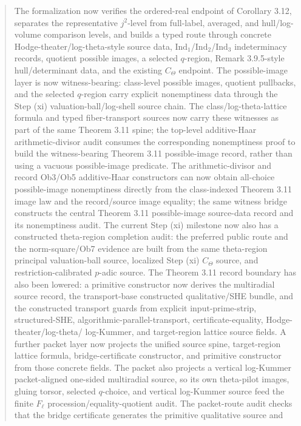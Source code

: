 \documentclass[11pt]{article}
\newcommand{\CTheta}{C_\Theta}
\newcommand{\IndOne}{\ensuremath{\mathrm{Ind}_1}}
\newcommand{\IndTwo}{\ensuremath{\mathrm{Ind}_2}}
\newcommand{\IndThree}{\ensuremath{\mathrm{Ind}_3}}
\theoremstyle{plain}
\theoremstyle{definition}
\theoremstyle{remark}
\begin{document}
\begin{abstract}
The formalization now verifies the ordered-real endpoint of Corollary 3.12,
separates the representative \(j^2\)-level from full-label, averaged, and
hull/log-volume comparison levels, and builds a typed route through
concrete Hodge-theater/log-theta-style source data, \IndOne/\IndTwo/\IndThree
indeterminacy records, quotient possible images, a selected \(q\)-region,
Remark 3.9.5-style hull/determinant data, and the existing \(\CTheta\)
endpoint.  The possible-image layer is now witness-bearing: class-level
possible images, quotient pullbacks, and the selected \(q\)-region carry
explicit nonemptiness data through the Step (xi) valuation-ball/log-shell
source chain.  The class/log-theta-lattice formula and typed fiber-transport
sources now carry these witnesses as part of the same Theorem 3.11 spine; the
top-level additive-Haar arithmetic-divisor audit consumes the corresponding
nonemptiness proof to build the witness-bearing Theorem 3.11 possible-image
record, rather than using a vacuous possible-image predicate.  The
arithmetic-divisor and record Ob3/Ob5 additive-Haar constructors can now obtain
all-choice possible-image nonemptiness directly from the class-indexed
Theorem 3.11 image law and the record/source image equality; the same witness
bridge constructs the central Theorem 3.11 possible-image source-data record
and its nonemptiness audit.  The current Step (xi) milestone now also has a
constructed theta-region completion audit: the preferred public route and the
norm-square/Ob7 evidence are built from the same theta-region principal
valuation-ball source, localized Step (xi) \(C_\Theta\) source, and
restriction-calibrated \(p\)-adic source.  The Theorem 3.11 record boundary has
also been lowered: a primitive constructor now derives the multiradial source
record, the transport-base constructed qualitative/SHE bundle, and the
constructed transport guards from explicit input-prime-strip, structured-SHE,
algorithmic-parallel-transport, certificate-equality, Hodge-theater/log-theta/
log-Kummer, and target-region lattice source fields.  A further packet layer now
projects the unified source spine, target-region lattice formula,
bridge-certificate constructor, and primitive constructor from those concrete
fields.  The packet also projects a vertical log-Kummer packet-aligned
one-sided multiradial source, so its own theta-pilot images, gluing torsor,
selected \(q\)-choice, and vertical log-Kummer source feed the finite
\(F_\ell\) procession/equality-quotient audit.  The packet-route audit checks
that the bridge certificate generates the primitive qualitative source and

\end{abstract}
\end{document}
